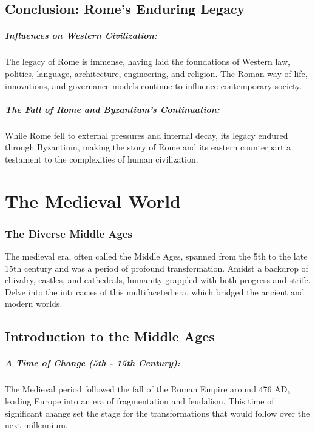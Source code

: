 \documentclass[a4paper,12pt]{book}
\begin{document}
\section*{Conclusion: Rome's Enduring Legacy}

\paragraph{Influences on Western Civilization:}
The legacy of Rome is immense, having laid the foundations of Western law, politics, language, architecture, engineering, and religion. The Roman way of life, innovations, and governance models continue to influence contemporary society.

\paragraph{The Fall of Rome and Byzantium’s Continuation:}
While Rome fell to external pressures and internal decay, its legacy endured through Byzantium, making the story of Rome and its eastern counterpart a testament to the complexities of human civilization.

\chapter{The Medieval World}
\subsection*{The Diverse Middle Ages}
The medieval era, often called the Middle Ages, spanned from the 5th to the late 15th century and was a period of profound transformation. Amidst a backdrop of chivalry, castles, and cathedrals, humanity grappled with both progress and strife. Delve into the intricacies of this multifaceted era, which bridged the ancient and modern worlds.

\section*{Introduction to the Middle Ages}

\paragraph{A Time of Change (5th - 15th Century):}
The Medieval period followed the fall of the Roman Empire around 476 AD, leading Europe into an era of fragmentation and feudalism. This time of significant change set the stage for the transformations that would follow over the next millennium.
\end{document}
